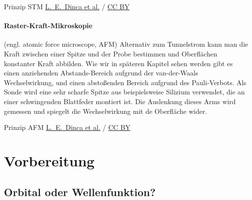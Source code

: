 \begin{marginfigure}
\caption{Prinzip STM
\href{https://commons.wikimedia.org/wiki/File:Pentacene_on_Ni(111)_STM.jpg}{L.~E.~Dinca et al.}  / \href{https://creativecommons.org/licenses/by/4.0}{CC BY}
}
\end{marginfigure}


\paragraph{Raster-Kraft-Mikroskopie} (engl. atomic force microscope, AFM) Alternativ zum Tunnelstrom kann man die Kraft zwischen einer Spitze und der Probe bestimmen und Oberflächen konstanter Kraft abbilden. Wie wir in späteren Kapitel sehen werden gibt es einen anziehenden Abstands-Bereich aufgrund der van-der-Waals Wechselwirkung, und einen abstoßenden Bereich aufgrund des Pauli-Verbots. Als Sonde wird eine sehr scharfe Spitze aus beispielsweise Silizium verwendet, die an einer schwingenden Blattfeder montiert ist. Die Auslenkung dieses Arms wird gemessen und spiegelt die Wechselwirkung mit de Oberfläche wider.


\begin{marginfigure}
\caption{Prinzip AFM
\href{https://commons.wikimedia.org/wiki/File:Pentacene_on_Ni(111)_STM.jpg}{L.~E.~Dinca et al.}  / \href{https://creativecommons.org/licenses/by/4.0}{CC BY}
}
\end{marginfigure}

 
\section{Vorbereitung}


\subsection{Orbital oder Wellenfunktion?}

